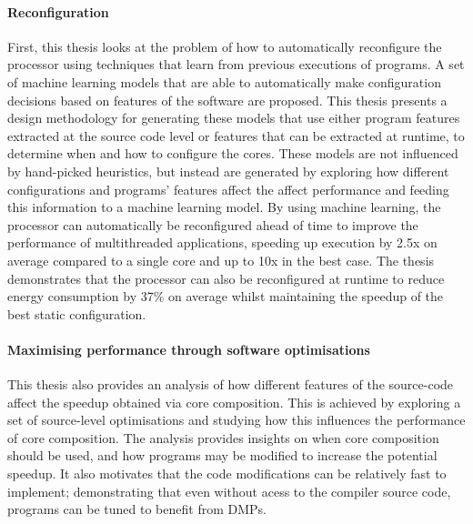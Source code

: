\paragraph*{Reconfiguration}
First, this thesis looks at the problem of how to automatically reconfigure the processor using techniques that learn from previous executions of programs.
A set of machine learning models that are able to automatically make configuration decisions based on features of the software are proposed.
This thesis presents a design methodology for generating these models that use either program features extracted at the source code level or features that can be extracted at runtime, to determine when and how to configure the cores.
These models are not influenced by hand-picked heuristics, but instead are generated by exploring how different configurations and programs' features affect the affect performance and feeding this information to a machine learning model.
By using machine learning, the processor can automatically be reconfigured ahead of time to improve the performance of multithreaded applications, speeding up execution by 2.5x on average compared to a single core and up to 10x in the best case.
The thesis demonstrates that the processor can also be reconfigured at runtime to reduce energy consumption by 37\% on average whilst maintaining the speedup of the best static configuration.

\paragraph*{Maximising performance through software optimisations}
This thesis also provides an analysis of how different features of the source-code affect the speedup obtained via core composition.
This is achieved by exploring a set of source-level optimisations and studying how this influences the performance of core composition.
The analysis provides insights on when core composition should be used, and how programs may be modified to increase the potential speedup.
It also motivates that the code modifications can be relatively  fast to implement; demonstrating that even without acess to the compiler source code, programs can be tuned to benefit from DMPs.

